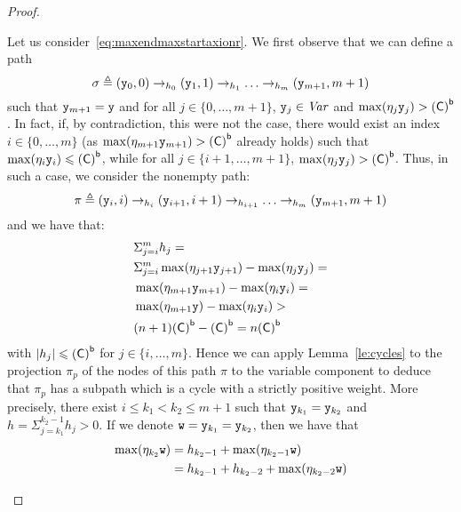 \begin{proof}
\begin{inductive}
    Let us consider\ \eqref{eq:maxendmaxstartaxionr}. We first observe that we
    can define a path
    \begin{equation}\label{eq:sigmapathnr}
      \sigma \veq (\var[y]_0, 0) \to_{h_0} (\var[y]_1, 1) \to_{h_1}
      \ldots \to_{h_m} (\var[y]_{m+1}, m+1)
    \end{equation}
    such that \(\var[y]_{m+1}=\var[y]\) and for all \(j \in \{0,\ldots, m+1\}\), 
    \(\var[y]_j\in \Var\)  and
    \(\max(\eta_{j} \var[y]_{j}) > \bound{\com}\).
    In fact, if, by contradiction, this were not the case, there would
    exist an index \(i \in \{0,\ldots, m\}\) (as
    \(\max(\eta_{m+1} \var[y]_{m+1}) > \bound{\com}\) already holds)
    such that \(\max(\eta_{i} \var[y]_{i}) \leq \bound{\com}\), while
    for all \(j \in \{i+1,\ldots, m+1\}\),
    \(\max(\eta_{j} \var[y]_j) > \bound{\com}\).  Thus, in such a case,
    we consider the nonempty path:
    \begin{equation}\label{eq:pinr}
      \pi \veq (\var[y]_i, i) \to_{h_i} (\var[y]_{i+1}, i+1) \to_{h_{i+1}} \ldots \to_{h_m} (\var[y]_{m+1}, m+1)
    \end{equation}
    and we have that:
    \begin{align*}
      &\Sigma_{j=i}^m h_j =\\ 
      &\Sigma_{j=i}^m \max(\eta_{j+1} \var[y]_{j+1}) - \max(\eta_j \var[y]_{j}) =\\
      &\max(\eta_{m+1} \var[y]_{m+1}) - \max(\eta_i \var[y]_{i}) =\\
      &\max(\eta_{m+1} \var[y]) - \max(\eta_i \var[y]_{i})>\\
      &  (n+1) \bound{\com} - \bound{\com} = n \bound{\com}
    \end{align*}
    with \(|h_j| \leq \bound{\com}\) for \(j \in \{i,\ldots,
    m\}\). Hence we can apply Lemma~\ref{le:cycles} to the projection
    \(\pi_p\) of the nodes of this path \(\pi\) to the variable
    component to deduce that \(\pi_p\) has a subpath which is a cycle
    with a strictly positive weight.  More precisely, there exist
    \(i \leq k_1 < k_2 \leq m+1\) such that
    \(\var[y]_{k_1} = \var[y]_{k_2}\) and
    \(h = \Sigma_{j=k_1}^{k_2-1} h_j > 0\). If we denote
    \(\var[w] = \var[y]_{k_1} = \var[y]_{k_2}\), then we have that
    \begin{align*}
      \max(\eta_{k_2} \var[w]) & =  h_{k_2-1}  + \max(\eta_{k_2-1} \var[w]) \\
                               & =  h_{k_2-1} + h_{k_2-2} + \max(\eta_{k_2-2} \var[w])  \\

\end{align*}
\end{inductive}
\end{proof}
